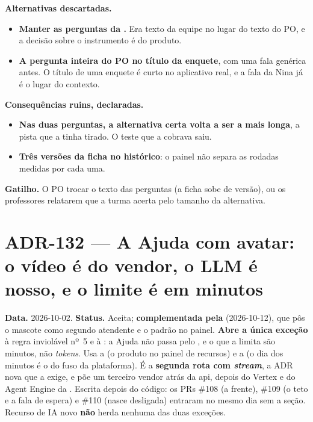 \textbf{Alternativas descartadas.}

\begin{itemize}
  \item \textbf{Manter as perguntas da .} Era texto da equipe no
    lugar do texto do PO, e a decisão sobre o instrumento é do produto.
  \item \textbf{A pergunta inteira do PO no título da enquete}, com uma fala
    genérica antes. O título de uma enquete é curto no aplicativo real, e a fala
    da Nina já é o lugar do contexto.
\end{itemize}

\textbf{Consequências ruins, declaradas.}

\begin{itemize}
  \item \textbf{Nas duas perguntas, a alternativa certa volta a ser a mais
    longa}, a pista que a  tinha tirado. O teste que a cobrava saiu.
  \item \textbf{Três versões da ficha no histórico}: o painel não separa as
    rodadas medidas por cada uma.
\end{itemize}

\textbf{Gatilho.} O PO trocar o texto das perguntas (a ficha sobe de versão), ou
os professores relatarem que a turma acerta pelo tamanho da alternativa.

\section{ADR-132 --- A Ajuda com avatar: o vídeo é do vendor, o LLM é nosso, e o limite é em minutos}
\label{adr:ajuda-com-avatar}

\textbf{Data.} 2026-10-02. \textbf{Status.} Aceita; \textbf{complementada
pela } (2026-10-12), que pôs o mascote como segundo atendente e
o padrão no painel. \textbf{Abre a única
exceção} à regra inviolável nº~5 e à : a Ajuda não passa pelo
, e o que a limita são minutos, não \emph{tokens}. Usa a
 (o produto  no painel de recursos) e a  (o
dia dos minutos é o do fuso da plataforma). É a \textbf{segunda rota com
\emph{stream}}, a ADR nova que a  exige, e põe um terceiro vendor
atrás da api, depois do Vertex e do Agent Engine da . Escrita
depois do código: os PRs \#108 (a frente), \#109 (o teto e a fala de espera) e
\#110 (nasce desligada) entraram no mesmo dia sem a seção. Recurso de IA novo
\textbf{não} herda nenhuma das duas exceções.


